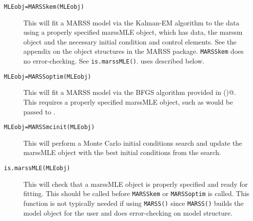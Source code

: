 \begin{description}
	\item[\texttt{MLEobj=MARSSkem(MLEobj)}] This will fit a MARSS model via the Kalman-EM algorithm to the data using a properly specified marssMLE object, which has data, the marssm object and the necessary initial condition and control elements.  See the appendix on the object structures in the MARSS package.  \texttt{MARSSkem}	does no error-checking.  See \texttt{is.marssMLE()}. \verb@MARSSkem@ uses \verb@MARSSkf@ described below.  
	\item[\texttt{MLEobj=MARSSoptim(MLEobj)}] This will fit a MARSS model via the BFGS algorithm provided in \verb@optim()@. This requires a properly specified marssMLE object, such as would be passed to \verb@MARSSkem@. 
	\item[\texttt{MLEobj=MARSSmcinit(MLEobj)}] This will perform a Monte Carlo initial conditions search and update the marssMLE object with the best initial conditions from the search.
	\item[\texttt{is.marssMLE(MLEobj)}] This will check that a marssMLE object is properly specified and ready for fitting.  This should be called before \texttt{MARSSkem} or \texttt{MARSSoptim} is called.  This function is not typically needed if using \texttt{MARSS()} since \texttt{MARSS()} builds the model object for the user and does error-checking on model structure.
\end{description}

